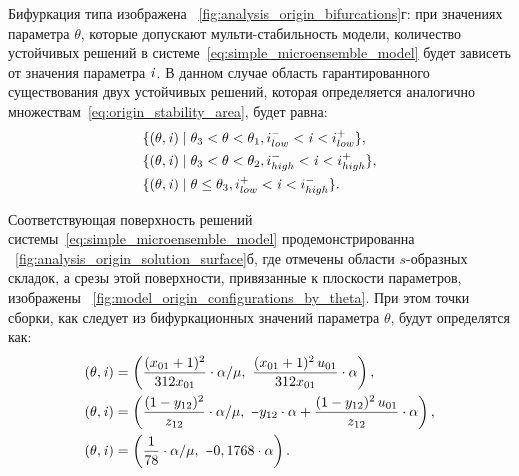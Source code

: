 Бифуркация типа  изображена \onfigure~\ref{fig:analysis_origin_bifurcations}г: при значениях параметра $\theta$, которые допускают мульти-стабильность модели, количество устойчивых решений в системе~\eqref{eq:simple_microensemble_model} будет зависеть от значения параметра $\mathit{i}$. В данном случае область гарантированного существования двух устойчивых решений, которая определяется аналогично множествам~\eqref{eq:origin_stability_area}, будет равна:
\begin{equation}
    \nonumber
    \begin{aligned}
        &\{ (\theta, \mathit{i}) \mid \theta_{3} < \theta < \theta_{1}, i^{-}_{low} < \mathit{i} < i^{+}_{low} \}, \\
        &\{ (\theta, \mathit{i}) \mid \theta_{3} < \theta < \theta_{2}, i^{-}_{high} < \mathit{i} < i^{+}_{high} \}, \\
        &\{ (\theta, \mathit{i}) \mid \theta \le \theta_{3}, i^{+}_{low} < \mathit{i} < i^{-}_{high} \}. \\
    \end{aligned}
\end{equation}

Соответствующая поверхность решений системы~\eqref{eq:simple_microensemble_model} продемонстрированна \onfigure~\ref{fig:analysis_origin_solution_surface}б, где отмечены области $s$-образных складок, а срезы этой поверхности, привязанные к плоскости параметров, изображены \onfigure~\ref{fig:model_origin_configurations_by_theta}. При этом точки сборки, как следует из бифуркационных значений параметра $\theta$, будут определятся как:
\begin{equation}
    \nonumber
    \begin{aligned}
    &(\theta, \scalar{i}) = \left( \dfrac{(x_{01} + 1)^2}{312 x_{01}} \cdot \alpha / \mu ,\ \dfrac{(x_{01} + 1)^2 \,u_{01}}{312 x_{01}} \cdot \alpha \right), \\
    &(\theta, \scalar{i}) = \left( \dfrac{(1 - y_{12})^2}{z_{12}} \cdot \alpha / \mu     ,\ \minus y_{12} \cdot \alpha + \dfrac{(1 - y_{12})^2 \,u_{01}}{z_{12}} \cdot \alpha \right) , \\
    &(\theta, \scalar{i}) = \left( \dfrac{1}{78} \cdot \alpha / \mu                      ,\ \minus 0,1768 \cdot \alpha \right).
    \end{aligned}
\end{equation}

